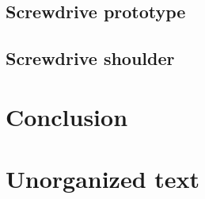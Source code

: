 \subsection*{Screwdrive prototype}
\subsection*{Screwdrive shoulder}

\section*{Conclusion}








\section{Unorganized text}








